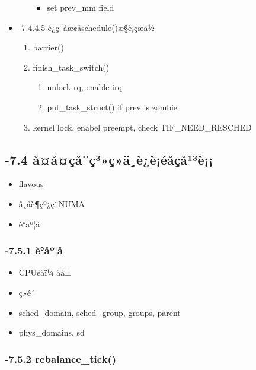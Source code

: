 \documentclass[11pt]{article}
\begin{document}
\begin{itemize}
\begin{enumerate}
\begin{itemize}
\item set prev\_mm field
\end{itemize}

\end{enumerate}

\item -7.4.4.5 è¿ç¨åæ¢åschedule()æ§è¡çæä½\\
\label{sec-2.4.4.5}

\begin{enumerate}
\item barrier()
\item finish\_task\_switch()

\begin{enumerate}
\item unlock rq, enable irq
\item put\_task\_struct() if prev is zombie
\end{enumerate}

\item kernel lock, enabel preempt, check TIF\_NEED\_RESCHED
\end{enumerate}
\end{itemize} %
\subsection{-7.4 å¤å¤çå¨ç³»ç»ä¸­è¿è¡éåçå¹³è¡¡}
\label{sec-2.5}

\begin{itemize}
\item flavous
\item å¸åè¶çº¿ç¨NUMA
\item è°åº¦å
\end{itemize}
\subsubsection{-7.5.1 è°åº¦å}
\label{sec-2.5.1}

\begin{itemize}
\item CPUéåï¼ åå±
\item ç»é´
\item sched\_domain, sched\_group, groups, parent
\item phys\_domains, sd
\end{itemize}
\subsubsection{-7.5.2 rebalance\_tick()}
\label{sec-2.5.2}
\end{document}

